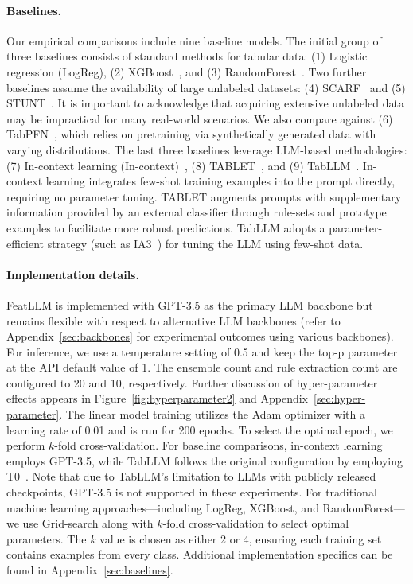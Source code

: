 \vspace*{-0.12in}
\paragraph{Baselines.}
Our empirical comparisons include nine baseline models. The initial group of three baselines consists of standard methods for tabular data: (1) Logistic regression (LogReg), (2) XGBoost~\cite{chen2016xgboost}, and (3) RandomForest~\cite{ho1995random}. Two further baselines assume the availability of large unlabeled datasets: (4) SCARF~\cite{bahri2022scarf} and (5) STUNT~\cite{nam2023stunt}. It is important to acknowledge that acquiring extensive unlabeled data may be impractical for many real-world scenarios. We also compare against (6) TabPFN~\cite{hollmann2022tabpfn}, which relies on pretraining via synthetically generated data with varying distributions. The last three baselines leverage LLM-based methodologies: (7) In-context learning (In-context)~\cite{wei2022emergent}, (8) TABLET~\cite{slack2023tablet}, and (9) TabLLM~\cite{hegselmann2023tabllm}. In-context learning integrates few-shot training examples into the prompt directly, requiring no parameter tuning. TABLET augments prompts with supplementary information provided by an external classifier through rule-sets and prototype examples to facilitate more robust predictions. TabLLM adopts a parameter-efficient strategy (such as IA3~\cite{liu2022few}) for tuning the LLM using few-shot data.

\vspace*{-0.12in}
\paragraph{Implementation details.}
\textsf{FeatLLM} is implemented with GPT-3.5 as the primary LLM backbone but remains flexible with respect to alternative LLM backbones (refer to Appendix~\ref{sec:backbones} for experimental outcomes using various backbones). For inference, we use a temperature setting of 0.5 and keep the top-p parameter at the API default value of 1. The ensemble count and rule extraction count are configured to 20 and 10, respectively. Further discussion of hyper-parameter effects appears in Figure~\ref{fig:hyperparameter2} and Appendix~\ref{sec:hyper-parameter}. The linear model training utilizes the Adam optimizer with a learning rate of 0.01 and is run for 200 epochs. To select the optimal epoch, we perform $k$-fold cross-validation. For baseline comparisons, in-context learning employs GPT-3.5, while TabLLM follows the original configuration by employing T0~\cite{sanh2022multitask}. Note that due to TabLLM’s limitation to LLMs with publicly released checkpoints, GPT-3.5 is not supported in these experiments. For traditional machine learning approaches—including LogReg, XGBoost, and RandomForest—we use Grid-search along with $k$-fold cross-validation to select optimal parameters. The $k$ value is chosen as either 2 or 4, ensuring each training set contains examples from every class. Additional implementation specifics can be found in Appendix~\ref{sec:baselines}.

